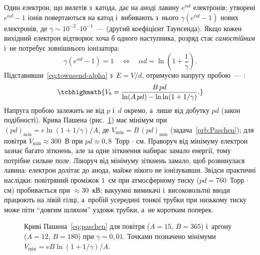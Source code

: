 Один електрон, що вилетів з~катода, дає на аноді лавину $e^{\alpha d}$ електронів; утворені
$e^{\alpha d}-1$ іонів повертаються на катод і~вибивають з~нього $\gamma(e^{\alpha d}-1)$ нових
електронів, де $\gamma\sim10^{-2}$--$10^{-1}$~---  (другий
коефіцієнт Таунсенда). Якщо кожен вихідний електрон відтворює хоча б одного наступника,
розряд стає \emph{самостійним} і~не потребує зовнішнього іонізатора:
\begin{equation}\label{eq:townsend-criterion}
	\gamma\left(e^{\alpha d}-1\right)=1\quad\Longleftrightarrow\quad \alpha d=\ln\left(1+\frac1\gamma\right).
\end{equation}
Підставивши~\eqref{eq:townsend-alpha} з~$E=V/d$, отримуємо напругу пробою~--- :
\begin{equation}\label{eq:paschen}
	\tcbhighmath{V_b=\frac{B\,pd}{\ln(A\,pd)-\ln\ln(1+1/\gamma)}.}
\end{equation}
Напруга пробою залежить не від $p$ і~$d$ окремо, а~лише від добутку $pd$ (закон подібності).
Крива Пашена (рис.~\ref{fig:paschen}) має мінімум при
$(pd)_{\min}=e\ln(1+1/\gamma)/A$, де $V_{\min}=B\,(pd)_{\min}$ (задача~\ref{prb:Paschen}); для повітря
$V_{\min}\approx300$~В при $pd\approx0{,}8$~Торр$\,\cdot\,$см.
Праворуч від мінімуму електрон зазнає багато зіткнень, але за одне зіткнення набирає замало енергії,
тому потрібне сильне поле. Ліворуч від мінімуму зіткнень замало, щоб розвинулася лавина: електрон
долітає до анода, майже нікого не іонізувавши. Звідси практичні наслідки:
повітряний проміжок $1$~см при атмосферному тиску ($pd=760$~Торр$\,\cdot\,$см) пробивається при
$\approx30$~кВ; вакуумні вимикачі і~високовольтні вводи працюють на лівій гілці, а~пробій усередині
тонкої трубки при низькому тиску може піти \enquote{довгим шляхом} уздовж трубки, а~не коротким
поперек.

\begin{figure}[ht]
	\centering
	\caption{Криві Пашена~\eqref{eq:paschen} для повітря ($A=15$, $B=365$) і~аргону ($A=12$, $B=180$) при
	$\gamma=0{,}01$. Точками позначено мінімуми $V_{\min}=eB\ln(1+1/\gamma)/A$.}
	\label{fig:paschen}
\end{figure}


